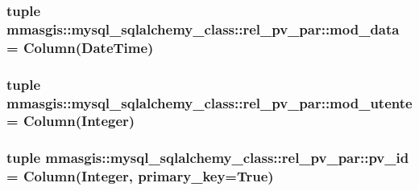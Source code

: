 \label{classmmasgis_1_1mysql__sqlalchemy__class_1_1rel__pv__par_a8d1e7ddddd71565efd004414c115dcbc}
\hypertarget{classmmasgis_1_1mysql__sqlalchemy__class_1_1rel__pv__par_aa6c15cdb93add6e98b1fac8a92ce5f22}{
\subsubsection[{mod\_\-data}]{\setlength{\rightskip}{0pt plus 5cm}tuple {\bf mmasgis::mysql\_\-sqlalchemy\_\-class::rel\_\-pv\_\-par::mod\_\-data} = Column(DateTime)}}
\label{classmmasgis_1_1mysql__sqlalchemy__class_1_1rel__pv__par_aa6c15cdb93add6e98b1fac8a92ce5f22}
\hypertarget{classmmasgis_1_1mysql__sqlalchemy__class_1_1rel__pv__par_adf2ab804c2d028cba13d0d542ba997cf}{
\subsubsection[{mod\_\-utente}]{\setlength{\rightskip}{0pt plus 5cm}tuple {\bf mmasgis::mysql\_\-sqlalchemy\_\-class::rel\_\-pv\_\-par::mod\_\-utente} = Column(Integer)}}
\label{classmmasgis_1_1mysql__sqlalchemy__class_1_1rel__pv__par_adf2ab804c2d028cba13d0d542ba997cf}
\hypertarget{classmmasgis_1_1mysql__sqlalchemy__class_1_1rel__pv__par_aa2ac354763197d11a1b597f4907e142f}{
\subsubsection[{pv\_\-id}]{\setlength{\rightskip}{0pt plus 5cm}tuple {\bf mmasgis::mysql\_\-sqlalchemy\_\-class::rel\_\-pv\_\-par::pv\_\-id} = Column(Integer, primary\_\-key=True)}}
